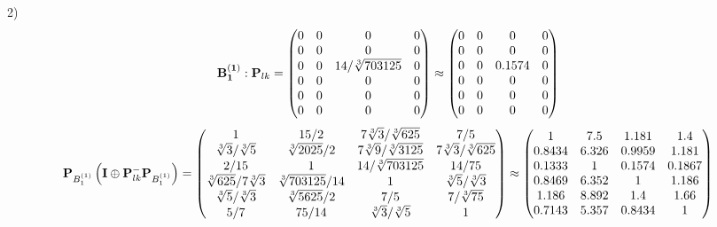 \documentclass[10pt,a4paper]{article}
\begin{document}
	2)
	\[
		\bold{B_1^{(1)}}: \bold{P}_{lk} = 
		\begin{pmatrix}
			{{0}}{} & {{0}}{} & {{0}}{} & {{0}}{} \\
			{{0}}{} & {{0}}{} & {{0}}{} & {{0}}{} \\
			{{0}}{} & {{0}}{} & {{14}} / {\sqrt[3]{703125}} & {{0}}{} \\
			{{0}}{} & {{0}}{} & {{0}}{} & {{0}}{} \\
			{{0}}{} & {{0}}{} & {{0}}{} & {{0}}{} \\
			{{0}}{} & {{0}}{} & {{0}}{} & {{0}}{} \\
		\end{pmatrix}
		\approx
		\begin{pmatrix}
			0        & 0        & 0        & 0        \\
			0        & 0        & 0        & 0        \\
			0        & 0        & 0.1574   & 0        \\
			0        & 0        & 0        & 0        \\
			0        & 0        & 0        & 0        \\
			0        & 0        & 0        & 0        \\
		\end{pmatrix}
	\]
	\[
		\bold{P}_{B_1^{(1)}}\left(\bold{I} \oplus \bold{P}_{lk}^{-}\bold{P}_{B_1^{(1)}}\right) = 
		\begin{pmatrix}
			{1}{} & {{15}} / {{2}} & {{7}\sqrt[3]{3}} / {\sqrt[3]{625}} & {{7}} / {{5}} \\
			{\sqrt[3]{3}} / {\sqrt[3]{5}} & {\sqrt[3]{2025}} / {{2}} & {{7}\sqrt[3]{9}} / {\sqrt[3]{3125}} & {{7}\sqrt[3]{3}} / {\sqrt[3]{625}} \\
			{{2}} / {{15}} & {1}{} & {{14}} / {\sqrt[3]{703125}} & {{14}} / {{75}} \\
			{\sqrt[3]{625}} / {{7}\sqrt[3]{3}} & {\sqrt[3]{703125}} / {{14}} & {1}{} & {\sqrt[3]{5}} / {\sqrt[3]{3}} \\
			{\sqrt[3]{5}} / {\sqrt[3]{3}} & {\sqrt[3]{5625}} / {{2}} & {{7}} / {{5}} & {{7}} / {\sqrt[3]{75}} \\
			{{5}} / {{7}} & {{75}} / {{14}} & {\sqrt[3]{3}} / {\sqrt[3]{5}} & {1}{} \\
		\end{pmatrix}
		\approx
		\begin{pmatrix}
			1        & 7.5      & 1.181    & 1.4      \\
			0.8434   & 6.326    & 0.9959   & 1.181    \\
			0.1333   & 1        & 0.1574   & 0.1867   \\
			0.8469   & 6.352    & 1        & 1.186    \\
			1.186    & 8.892    & 1.4      & 1.66     \\
			0.7143   & 5.357    & 0.8434   & 1        \\
		\end{pmatrix}
	\]
\end{document}
